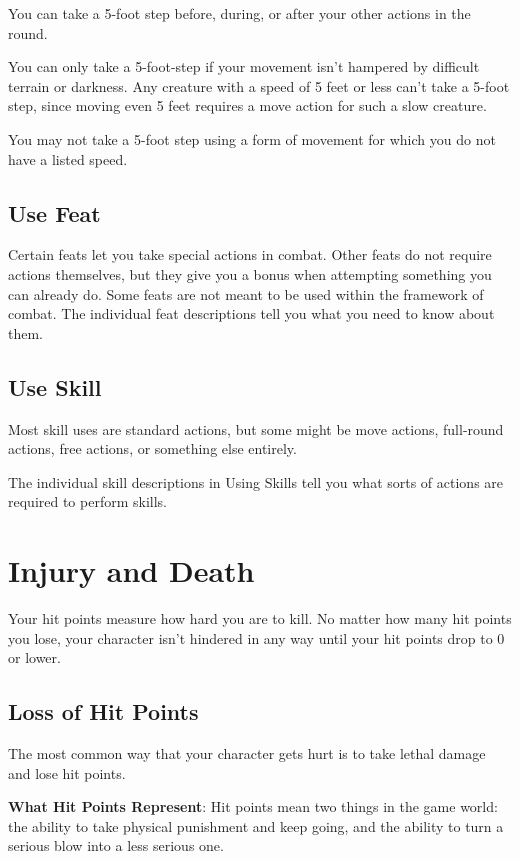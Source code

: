 You can take a 5-foot step before, during, or after your other actions in the round. 
				
You can only take a 5-foot-step if your movement isn't hampered by difficult terrain or darkness. Any creature with a speed of 5 feet or less can't take a 5-foot step, since moving even 5 feet requires a move action for such a slow creature.
				
You may not take a 5-foot step using a form of movement for which you do not have a listed speed. 
				
\subsection{Use Feat}

				
Certain feats let you take special actions in combat. Other feats do not require actions themselves, but they give you a bonus when attempting something you can already do. Some feats are not meant to be used within the framework of combat. The individual feat descriptions tell you what you need to know about them.
				
\subsection{Use Skill}

				
Most skill uses are standard actions, but some might be move actions, full-round actions, free actions, or something else entirely.
				
The individual skill descriptions in Using Skills tell you what sorts of actions are required to perform skills.
				
\section{Injury and Death}

				
Your hit points measure how hard you are to kill. No matter how many hit points you lose, your character isn't hindered in any way until your hit points drop to 0 or lower.
				
\subsection{Loss of Hit Points}

				
The most common way that your character gets hurt is to take lethal damage and lose hit points.
				
\textbf{What Hit Points Represent}: Hit points mean two things in the game world: the ability to take physical punishment and keep going, and the ability to turn a serious blow into a less serious one.
				
